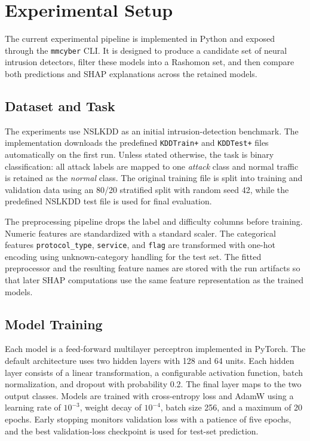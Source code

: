\section{Experimental Setup}

The current experimental pipeline is implemented in Python and exposed through the \texttt{mmcyber} \gls{CLI}. It is designed to produce a candidate set of neural intrusion detectors, filter these models into a Rashomon set, and then compare both predictions and \gls{SHAP} explanations across the retained models.

\subsection{Dataset and Task}

The experiments use \gls{NSLKDD} as an initial intrusion-detection benchmark. The implementation downloads the predefined \texttt{KDDTrain+} and \texttt{KDDTest+} files automatically on the first run. Unless stated otherwise, the task is binary classification: all attack labels are mapped to one \textit{attack} class and normal traffic is retained as the \textit{normal} class. The original training file is split into training and validation data using an 80/20 stratified split with random seed 42, while the predefined \gls{NSLKDD} test file is used for final evaluation.

The preprocessing pipeline drops the label and difficulty columns before training. Numeric features are standardized with a standard scaler. The categorical features \texttt{protocol\_type}, \texttt{service}, and \texttt{flag} are transformed with one-hot encoding using unknown-category handling for the test set. The fitted preprocessor and the resulting feature names are stored with the run artifacts so that later \gls{SHAP} computations use the same feature representation as the trained models.

\subsection{Model Training}

Each model is a feed-forward multilayer perceptron implemented in PyTorch. The default architecture uses two hidden layers with 128 and 64 units. Each hidden layer consists of a linear transformation, a configurable activation function, batch normalization, and dropout with probability 0.2. The final layer maps to the two output classes. Models are trained with cross-entropy loss and AdamW using a learning rate of $10^{-3}$, weight decay of $10^{-4}$, batch size 256, and a maximum of 20 epochs. Early stopping monitors validation loss with a patience of five epochs, and the best validation-loss checkpoint is used for test-set prediction.

